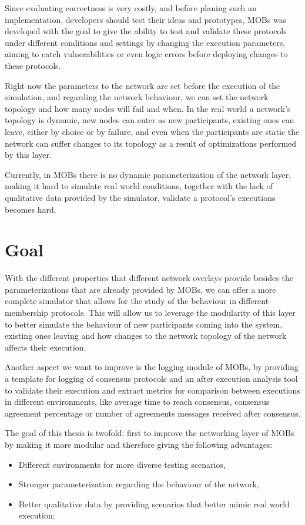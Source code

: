 Since evaluating correctness is very costly, and before planing such an implementation, developers should test their ideas and prototypes,
MOBs was developed with the goal to give the ability to test and validate these protocols under different conditions and settings by 
changing the execution parameters, aiming to catch vulnerabilities or even logic errors before deploying changes to these protocols.

Right now the parameters to the network are set before the execution of the simulation, and regarding the network behaviour, we can
set the network topology and how many nodes will fail and when. In the real world a network's topology is dynamic, new nodes can enter
as new participants, existing ones can leave, either by choice or by failure, and even when the participants are static the network
can suffer changes to its topology as a result of optimizations performed by this layer.

Currently, in MOBs there is no dynamic parameterization of the network layer, making it hard to simulate real world conditions,
together with the lack of qualitative data provided by the simulator, validate a protocol's executions becomes hard.


\section{Goal}\label{sub:goal}

With the different properties that different network overlays provide besides the parameterizations that are already provided by MOBs,
we can offer a more complete simulator that allows for the study of the behaviour in different membership protocols.
This will allow us to leverage the modularity of this layer to better simulate the behaviour of new participants coming into the system, existing
ones leaving and how changes to the network topology of the network affects their execution.

Another aspect we want to improve is the logging module of MOBs, by providing a template for logging of consensus protocols and
an after execution analysis tool to validate their execution and extract metrics for
comparison between executions in different environments, like average time to reach consensus, consensus agreement percentage or
number of agreements messages received after consensus.


The goal of this thesis is twofold: first to improve the networking layer of MOBs by making it more modular and therefore giving the following advantages:
\begin{itemize}
  \item Different environments for more diverse testing scenarios,
  \item Stronger parameterization regarding the behaviour of the network,
  \item Better qualitative data by providing scenarios that better mimic real world execution;
\end{itemize}


